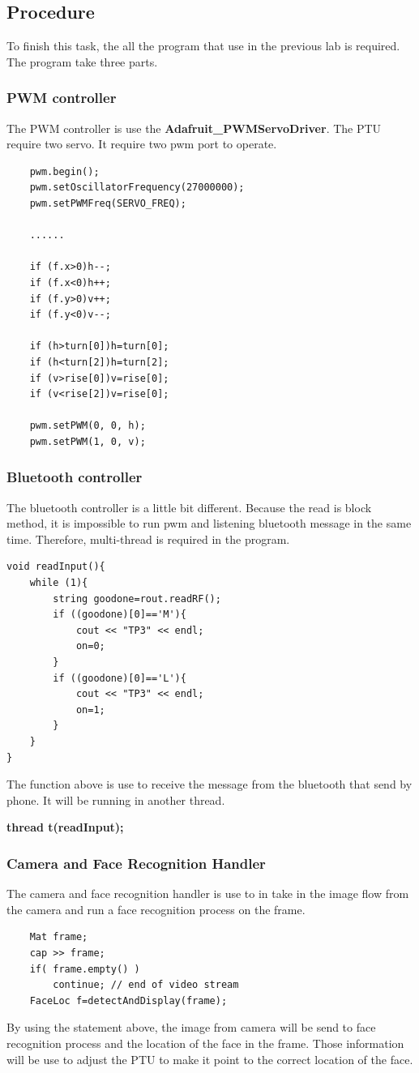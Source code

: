 \documentclass{article}
\begin{document}
\subsection{Procedure}
	To finish this task, the all the program that use in the previous lab is required. The program take three parts.
	\subsubsection{PWM controller}
		The PWM controller is use the \textbf{Adafruit\_PWMServoDriver}. The PTU require two servo. It require two pwm port to operate.  
		\begin{lstlisting}
	pwm.begin();
	pwm.setOscillatorFrequency(27000000);
	pwm.setPWMFreq(SERVO_FREQ);
	
	......
		
	if (f.x>0)h--;
	if (f.x<0)h++;
	if (f.y>0)v++;
	if (f.y<0)v--;
				
	if (h>turn[0])h=turn[0];
	if (h<turn[2])h=turn[2];
	if (v>rise[0])v=rise[0];
	if (v<rise[2])v=rise[0];
				
	pwm.setPWM(0, 0, h);
	pwm.setPWM(1, 0, v);
		\end{lstlisting}
	\subsubsection{Bluetooth controller}
		The bluetooth controller is a little bit different. Because the read is block method, it is impossible to run pwm and listening bluetooth message in the same time. Therefore, multi-thread is required in the program.
		\begin{lstlisting}
void readInput(){
	while (1){
		string goodone=rout.readRF();
		if ((goodone)[0]=='M'){
			cout << "TP3" << endl;
			on=0;
		}
		if ((goodone)[0]=='L'){
			cout << "TP3" << endl;
			on=1;
		}
	}
}
		\end{lstlisting}
		The function above is use to receive the message from the bluetooth that send by phone. It will be running in another thread.
		\begin{center}
		\textbf{thread t(readInput);}
		\end{center}
	\subsubsection{Camera and Face Recognition Handler}
		The camera and face recognition handler is use to in take in the image flow from the camera and run a face recognition process on the frame.
		\begin{lstlisting}
	Mat frame;
	cap >> frame;
	if( frame.empty() ) 
		continue; // end of video stream
	FaceLoc f=detectAndDisplay(frame);
		\end{lstlisting}
		By using the statement above, the image from camera will be send to face recognition process and the location of the face in the frame. Those information will be use to adjust the PTU to make it point to the correct location of the face.
\end{document}
